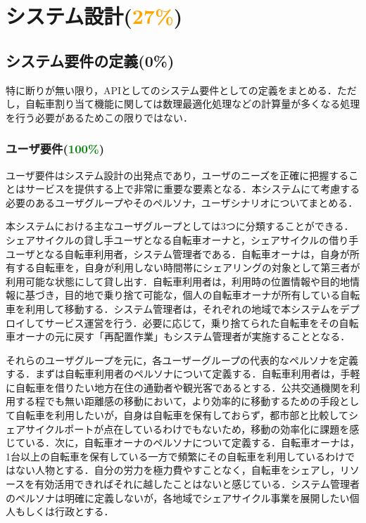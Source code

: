 \section{システム設計(\textcolor{orange}{27\%})}
  \label{sec:システム設計}
    \par
  
  \subsection{システム要件の定義(0\%)}
    \label{sec:システム要件の定義}
      \par 特に断りが無い限り，APIとしてのシステム要件としての定義をまとめる．ただし，自転車割り当て機能に関しては数理最適化処理などの計算量が多くなる処理を行う必要があるためこの限りではない．

      \subsubsection{ユーザ要件(\textcolor{green}{100\%})}
        \label{sec:ユーザ要件}
          \par ユーザ要件はシステム設計の出発点であり，ユーザのニーズを正確に把握することはサービスを提供する上で非常に重要な要素となる．本システムにて考慮する必要のあるユーザグループやそのペルソナ，ユーザシナリオについてまとめる．
          \par 本システムにおける主なユーザグループとしては3つに分類することができる．シェアサイクルの貸し手ユーザとなる自転車オーナと，シェアサイクルの借り手ユーザとなる自転車利用者，システム管理者である．自転車オーナは，自身が所有する自転車を，自身が利用しない時間帯にシェアリングの対象として第三者が利用可能な状態にして貸し出す．自転車利用者は，利用時の位置情報や目的地情報に基づき，目的地で乗り捨て可能な，個人の自転車オーナが所有している自転車を利用して移動する．システム管理者は，それぞれの地域で本システムをデプロイしてサービス運営を行う．必要に応じて，乗り捨てられた自転車をその自転車オーナの元に戻す「再配置作業」もシステム管理者が実施することとなる．
          \par それらのユーザグループを元に，各ユーザーグループの代表的なペルソナを定義する．まずは自転車利用者のペルソナについて定義する．自転車利用者は，手軽に自転車を借りたい地方在住の通勤者や観光客であるとする．公共交通機関を利用する程でも無い距離感の移動において，より効率的に移動するための手段として自転車を利用したいが，自身は自転車を保有しておらず，都市部と比較してシェアサイクルポートが点在しているわけでもないため，移動の効率化に課題を感じている．次に，自転車オーナのペルソナについて定義する．自転車オーナは，1台以上の自転車を保有している一方で頻繁にその自転車を利用しているわけではない人物とする．自分の労力を極力費やすことなく，自転車をシェアし，リソースを有効活用できればそれに越したことはないと感じている．システム管理者のペルソナは明確に定義しないが，各地域でシェアサイクル事業を展開したい個人もしくは行政とする．
